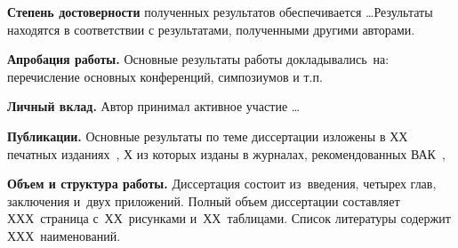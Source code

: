 \textbf{Степень достоверности} полученных результатов обеспечивается \ldots Результаты находятся в соответствии с результатами, полученными другими авторами.

\textbf{Апробация работы.}
Основные результаты работы докладывались~на:
перечисление основных конференций, симпозиумов и т.п.

\textbf{Личный вклад.} Автор принимал активное участие \ldots

\textbf{Публикации.} Основные результаты по теме диссертации изложены в ХХ печатных изданиях~\cite{Main1,Main2,WaveSkeletization},
Х из которых изданы в журналах, рекомендованных ВАК~\cite{Main1,Main2,WaveSkeletization}, 

\textbf{Объем и структура работы.} Диссертация состоит из~введения, четырех глав, заключения и~двух приложений. Полный объем диссертации составляет ХХХ~страница с~ХХ~рисунками и~ХХ~таблицами. Список литературы содержит ХХХ~наименований.

\clearpage